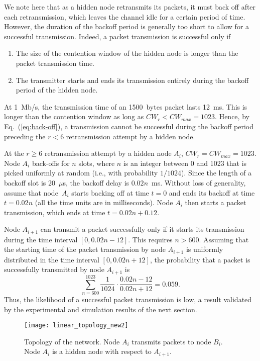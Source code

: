 \documentclass{IEEEtran}
\begin{document}
We note here that as  a hidden node retransmits its packets, it must back off after each retransmission, which leaves the channel idle for a certain
period of time. However, the duration of the backoff period is generally too short to allow for a successful transmission.
Indeed, a packet transmission is successful only if
\begin{enumerate}
\item The size of the contention window  of the hidden node is longer than the packet transmission time.
    \item The transmitter starts and ends its transmission entirely during the backoff period of the hidden node.
\end{enumerate}
At 1~Mb/s, the transmission time of an 1500~bytes packet lasts 12~ms. This is longer than
the contention window as long as $CW_{r} < CW_{max} = 1023$. Hence, by Eq.~(\ref{eq:back-off}), a transmission cannot be successful during the
backoff period preceding the $r < 6$ retransmission attempt by a hidden node.

At the $r \geq 6$ retransmission attempt by a hidden node $A_i$, $CW_{r} = CW_{max} = 1023$. Node $A_i$  back-offs for $n$ slots, where $n$ is an integer between 0 and 1023 that is picked uniformly at random (i.e., with probability $1/1024$).
Since the length of a backoff slot is 20~$\mu$s, the backoff delay is $0.02n$~ms. Without loss of generality, assume that node~$A_i$ starts backing off at time $t=0$ and ends its backoff at time $t=0.02n$ (all the time units are in milliseconds). Node $A_i$ then starts a packet transmission, which ends at time $t=0.02n+0.12$.

Node $A_{i+1}$ can transmit a packet successfully only if it starts its transmission during the time interval $[0,0.02n-12]$. This requires $n>600$. Assuming that the starting time of the packet transmission by node $A_{i+1}$ is uniformly distributed in the time interval $[0,0.02n+12]$, the probability that a packet is successfully transmitted by node $A_{i+1}$  is \[\sum_{n=600}^{1023} \frac{1}{1024} \cdot \frac{0.02n-12}{0.02n+12} = 0.059.\]
Thus, the likelihood of a successful packet transmission is low, a result validated by the experimental and simulation results of the next section.

 



\begin{figure}[!t]
\centering
\texttt{[image: linear\_topology\_new2]}
\caption{Topology of the network. Node $A_i$ transmits packets to node $B_i$. Node $A_{i}$ is a hidden node with respect to $A_{i+1}$.}
\label{linear_topology}
\end{figure}
\end{document}
